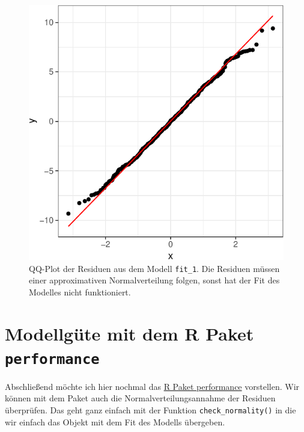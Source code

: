 \documentclass[
  letterpaper,
]{scrbook}
\begin{document}
\begin{figure}[H]

{\centering \includegraphics{./stat-linear-reg-quality_files/figure-pdf/fig-scatter-qual-resid-1.pdf}

}

\caption{\label{fig-scatter-qual-resid}QQ-Plot der Residuen aus dem
Modell \texttt{fit\_1}. Die Residuen müssen einer approximativen
Normalverteilung folgen, sonst hat der Fit des Modelles nicht
funktioniert.}

\end{figure}

\hypertarget{modellguxfcte-mit-dem-r-paket-performance}{%
\section{\texorpdfstring{Modellgüte mit dem R Paket
\texttt{performance}}{Modellgüte mit dem R Paket performance}}\label{modellguxfcte-mit-dem-r-paket-performance}}

Abschließend möchte ich hier nochmal das
\href{https://easystats.github.io/performance/}{R Paket performance}
vorstellen. Wir können mit dem Paket auch die Normalverteilungsannahme
der Residuen überprüfen. Das geht ganz einfach mit der Funktion
\texttt{check\_normality()} in die wir einfach das Objekt mit dem Fit
des Modells übergeben.
\end{document}
